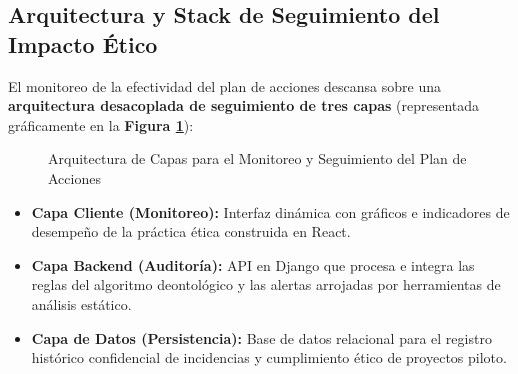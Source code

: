 \documentclass[12pt,a4paper]{article}
\begin{document}
\subsection{Arquitectura y Stack de Seguimiento del Impacto Ético}
El monitoreo de la efectividad del plan de acciones descansa sobre una \textbf{arquitectura desacoplada de seguimiento de tres capas} (representada gráficamente en la \textbf{Figura \ref{fig:arquitectura_seguimiento}}):

\begin{figure}[H]
    \centering
    \caption{Arquitectura de Capas para el Monitoreo y Seguimiento del Plan de Acciones}
    \label{fig:arquitectura_seguimiento}
\end{figure}

\begin{itemize}
    \item \textbf{Capa Cliente (Monitoreo):} Interfaz dinámica con gráficos e indicadores de desempeño de la práctica ética construida en React.
    \item \textbf{Capa Backend (Auditoría):} API en Django que procesa e integra las reglas del algoritmo deontológico y las alertas arrojadas por herramientas de análisis estático.
    \item \textbf{Capa de Datos (Persistencia):} Base de datos relacional para el registro histórico confidencial de incidencias y cumplimiento ético de proyectos piloto.
\end{itemize}
\end{document}
